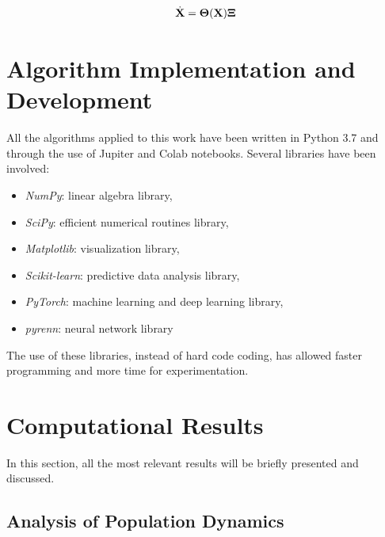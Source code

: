 \documentclass[]{article}
\begin{document}
\begin{equation}
\dot{\textbf X} = \bf \Theta(\textbf X) \bf{\Xi}
\end{equation}
\section{Algorithm Implementation and Development}
All the algorithms applied to this work have been written in Python 3.7 and through the use of Jupiter and Colab notebooks. Several libraries have been involved:

\begin{itemize}
    \item \textit{NumPy}: linear algebra library,
    \item \textit{SciPy}: efficient numerical routines library,
    \item \textit{Matplotlib}: visualization library,
    \item \textit{Scikit-learn}: predictive data analysis library,
    \item \textit{PyTorch}: machine learning and deep learning library,
    \item \textit{pyrenn}: neural network library
\end{itemize}

The use of these libraries, instead of hard code coding, has allowed faster programming and more time for experimentation.

\section{Computational Results}
In this section, all the most relevant results will be briefly presented and discussed.

\subsection{Analysis of Population Dynamics}
\end{document}
